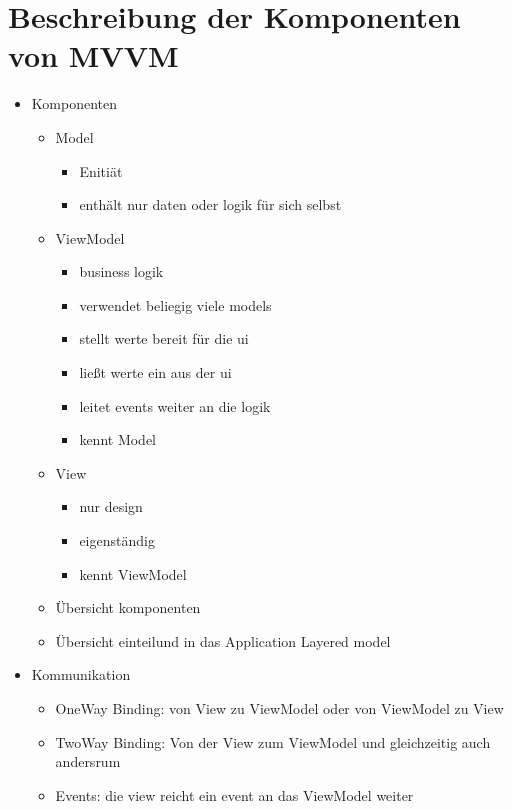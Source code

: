 \documentclass[titlepage=false,12pt]{scrreprt}
\begin{document}
	\chapter{Beschreibung der Komponenten von MVVM}
	\begin{itemize}
		\item Komponenten
		\begin{itemize}
			\item Model
			\begin{itemize}
				\item Enitiät
				\item enthält nur daten oder logik für sich selbst
			\end{itemize}
			\item ViewModel
			\begin{itemize}
				\item business logik
				\item verwendet beliegig viele models
				\item stellt werte bereit für die ui
				\item ließt werte ein aus der ui
				\item leitet events weiter an die logik
				\item kennt Model
			\end{itemize}
			\item View
			\begin{itemize}
				\item nur design
				\item eigenständig
				\item kennt ViewModel 
			\end{itemize}
			\item Übersicht komponenten
			\item Übersicht einteilund in das Application Layered model
		\end{itemize}
		\item Kommunikation
		\begin{itemize}
			\item OneWay Binding: von View zu ViewModel oder von ViewModel zu View
			\item TwoWay Binding: Von der View zum ViewModel und gleichzeitig auch andersrum
			\item Events: die view reicht ein event an das ViewModel weiter 
		\end{itemize}
	\end{itemize}
\end{document}

